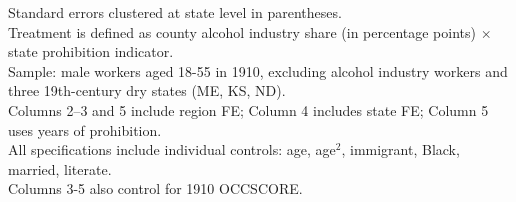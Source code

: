\par \raggedright 
Standard errors clustered at state level in parentheses.\\
Treatment is defined as county alcohol industry share (in percentage points) $\times$ state prohibition indicator.\\
Sample: male workers aged 18-55 in 1910, excluding alcohol industry workers and three 19th-century dry states (ME, KS, ND).\\
Columns 2--3 and 5 include region FE; Column 4 includes state FE; Column 5 uses years of prohibition.\\
All specifications include individual controls: age, age$^2$, immigrant, Black, married, literate.\\
Columns 3-5 also control for 1910 OCCSCORE.
\par\endgroup


